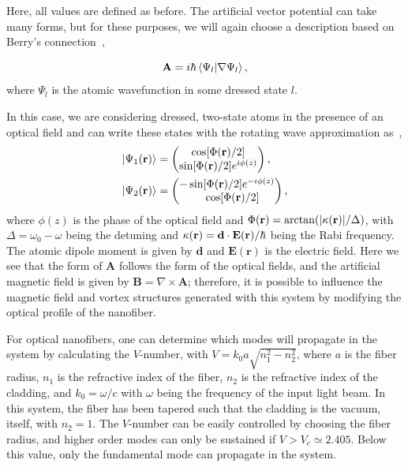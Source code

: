 \noindent Here, all values are defined as before.
The artificial vector potential can take many forms, but for these purposes, we will again choose a description based on Berry's connection~\cite{dalibard2011},

\begin{equation}
  \mathbf{A} = i\hbar \braket{\Psi_l | \nabla \Psi_l},
\end{equation}
\noindent where $\Psi_l$ is the atomic wavefunction in some dressed state $l$.

In this case, we are considering dressed, two-state atoms in the presence of an optical field and can write these states with the rotating wave approximation as~\cite{mochol2015},
\begin{align}
\ket{\Psi_1({\bf r})} &= 
\begin{pmatrix}
    \cos[\Phi({\bf r})/2] \\
     \sin[\Phi({\bf r}) /2]e^{i\phi(z)} 
\end{pmatrix},\\
\ket{\Psi_2({\bf r})} &= 
\begin{pmatrix}
    -\sin[\Phi({\bf r}) /2]e^{-i\phi(z)} \\
    \quad\cos[\Phi({\bf r})/2]
\end{pmatrix},
\end{align}
\noindent where $\phi(z)$ is the phase of the optical field and $\Phi({\bf r}) = \arctan(|\kappa({\bf r})|/\Delta)$, with $\Delta = \omega_0 - \omega$ being the detuning and $\kappa({\bf r}) = \mathbf{d} \cdot \mathbf{E}({\bf r}) / \hbar$ being the Rabi frequency.
The atomic dipole moment is given by $\mathbf{d}$ and $\mathbf{E(\mathbf{r})}$ is the electric field.
Here we see that the form of $\mathbf{A}$ follows the form of the optical fields, and the artificial magnetic field is given by $\mathbf{B}= \nabla \times \mathbf{A}$; therefore, it is possible to influence the magnetic field and vortex structures generated with this system by modifying the optical profile of the nanofiber.

For optical nanofibers, one can determine which modes will propagate in the system by calculating the $V$-number, with $V = k_0a\sqrt{n_1^2 - n_2^2}$, where $a$ is the fiber radius, $n_1$ is the refractive index of the fiber, $n_2$ is the refractive index of the cladding, and $k_0 = \omega/c$ with $\omega$ being the frequency of the input light beam.
In this system, the fiber has been tapered such that the cladding is the vacuum, itself, with $n_2=1$.
The $V$-number can be easily controlled by choosing the fiber radius, and 
higher order modes can only be sustained if $V > V_c \simeq 2.405$.
Below this value, only the fundamental mode can propagate in the system.

